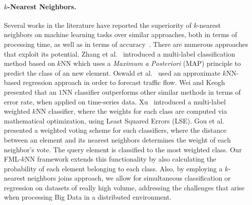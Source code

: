 \paragraph{\texorpdfstring{$k$}--Nearest Neighbors.} Several works in the literature have reported the superiority of $k$-nearest neighbors on machine learning tasks over similar approaches, both in terms of processing time, as well as in terms of accuracy~\cite{amancio2014systematic, yang1999evaluation, colas2009data}. There are numerous approaches that exploit its potential. Zhang et al.~\cite{linkg2005multi} introduced a multi-label classification method based on $k$NN which uses a \textit{Maximum a Posteriori} (MAP) principle to predict the class of an new element. Oswald et al.~\cite{oswald2001traffic} used an approximate $k$NN-based regression approach in order to forecast traffic flow. Wei and Keogh~\cite{wei2006semi} presented that an $1$NN classifier outperforms other similar methods in terms of error rate, when applied on time-series data. Xu~\cite{Xu2011mwk} introduced a multi-label weighted $k$NN classifier, where the weights for each class are computed via mathematical optimization, using Least Squared Errors (LSE). Gou et al.~\cite{Gou2011jcp} presented a weighted voting scheme for such classifiers, where the distance between an element and its nearest neighbors determines the weight of each neighbor's vote. The query element is classified to the most weighted class. Our FML-$k$NN framework extends this functionality by also calculating the probability of each element belonging to each class. Also, by employing a $k$-nearest neighbors joins approach, we allow for simultaneous classification or regression on datasets of really high volume, addressing the challenges that arise when processing Big Data in a distributed environment.

